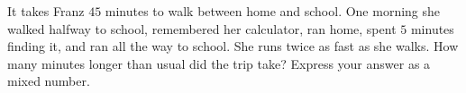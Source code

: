 It takes Franz $45$ minutes to walk between home and school. One morning she walked halfway to school, remembered her calculator, ran home, spent $5$ minutes finding it, and ran all the way to school. She runs twice as fast as she walks. How many minutes longer than usual did the trip take? Express your answer as a mixed number.
